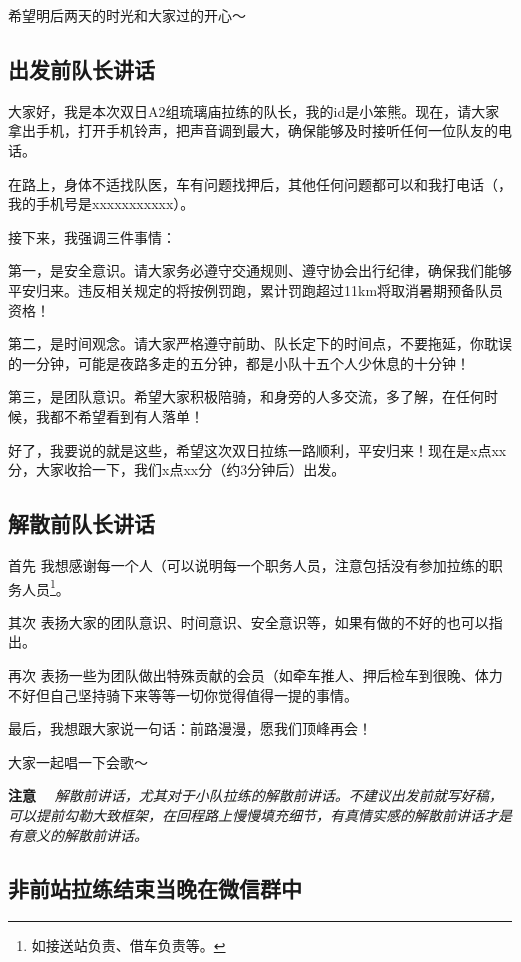 \documentclass[UTF8]{ctexart}
\begin{document}
希望明后两天的时光和大家过的开心～

\subsection{出发前队长讲话}

大家好，我是本次双日A2组琉璃庙拉练的队长，我的id是小笨熊。现在，请大家拿出手机，打开手机铃声，把声音调到最大，确保能够及时接听任何一位队友的电话。

在路上，身体不适找队医，车有问题找押后，其他任何问题都可以和我打电话（，我的手机号是xxxxxxxxxxx）。

接下来，我强调三件事情：

第一，是安全意识。请大家务必遵守交通规则、遵守协会出行纪律，确保我们能够平安归来。违反相关规定的将按例罚跑，累计罚跑超过11km将取消暑期预备队员资格！

第二，是时间观念。请大家严格遵守前助、队长定下的时间点，不要拖延，你耽误的一分钟，可能是夜路多走的五分钟，都是小队十五个人少休息的十分钟！

第三，是团队意识。希望大家积极陪骑，和身旁的人多交流，多了解，在任何时候，我都不希望看到有人落单！

好了，我要说的就是这些，希望这次双日拉练一路顺利，平安归来！现在是x点xx分，大家收拾一下，我们x点xx分（约3分钟后）出发。

\subsection{解散前队长讲话}

首先 我想感谢每一个人（可以说明每一个职务人员，注意包括没有参加拉练的职务人员\footnote{如接送站负责、借车负责等。}。

其次 表扬大家的团队意识、时间意识、安全意识等，如果有做的不好的也可以指出。

再次 表扬一些为团队做出特殊贡献的会员（如牵车推人、押后检车到很晚、体力不好但自己坚持骑下来等等一切你觉得值得一提的事情。

最后，我想跟大家说一句话：前路漫漫，愿我们顶峰再会！

大家一起唱一下会歌～

\textbf{注意} \ \ \textit{解散前讲话，尤其对于小队拉练的解散前讲话。不建议出发前就写好稿，可以提前勾勒大致框架，在回程路上慢慢填充细节，有真情实感的解散前讲话才是有意义的解散前讲话。}

\subsection{非前站拉练结束当晚在微信群中}
\end{document}
